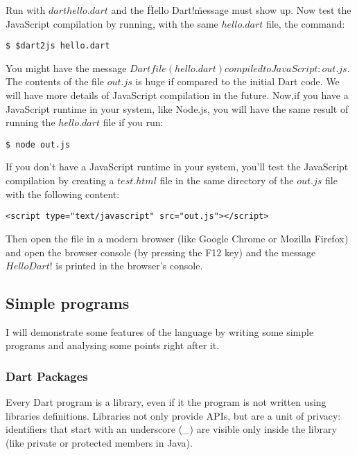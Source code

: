 Run with $dart hello.dart$ and the \"Hello Dart!\" message must show up. Now
test the JavaScript compilation by running, with the same $hello.dart$ file, the
command:

\begin{verbatim}
$ $dart2js hello.dart
\end{verbatim}

You might have the message $Dart file (hello.dart) compiled to JavaScript:
out.js$. The contents of the file $out.js$ is huge if compared to the initial
Dart code. We will have more details of JavaScript compilation in the future.
Now,if you have a JavaScript runtime in your system, like Node.js, you will have
the same result of running the $hello.dart$ file if you run:

\begin{verbatim}
$ node out.js
\end{verbatim}

If you don't have a JavaScript runtime in your system, you'll test the
JavaScript compilation by creating a $test.html$ file in the same directory
of the $out.js$ file with the following content:

\begin{verbatim}
<script type="text/javascript" src="out.js"></script>
\end{verbatim}

Then open the file in a modern browser (like Google Chrome or Mozilla Firefox)
and open the browser console (by pressing the F12 key) and the message $Hello
Dart!$ is printed in the browser's console.

\subsection{Simple programs}

I will demonstrate some features of the language by writing some simple
programs and analysing some points right after it.

\subsubsection{Dart Packages}

Every Dart program is a library, even if it the program is not written using
libraries definitions. Libraries not only provide APIs, but are a unit of
privacy: identifiers that start with an underscore (\_) are visible only
inside the library (like private or protected members in Java).

